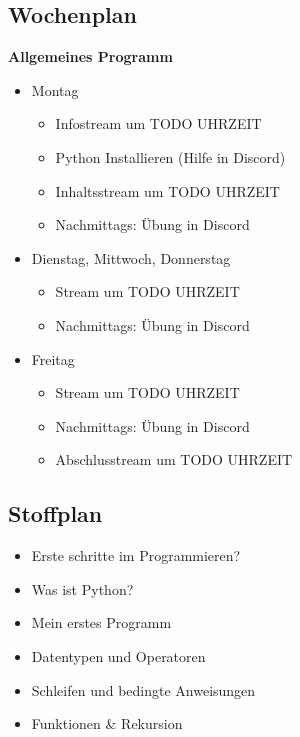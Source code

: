 \subsection{Wochenplan}
\begin{frame}
	\slidehead
	\textbf{Allgemeines Programm}
	\begin{itemize}
		\item Montag
		\begin{itemize}
			\item Infostream um TODO UHRZEIT
			\item Python Installieren (Hilfe in Discord)
			\item Inhaltsstream um TODO UHRZEIT
			\item Nachmittags: Übung in Discord
		\end{itemize}
		\item Dienstag, Mittwoch, Donnerstag
		\begin{itemize}
			\item Stream um TODO UHRZEIT
			\item Nachmittags: Übung in Discord
		\end{itemize}
		\item Freitag
		\begin{itemize}
			\item Stream um TODO UHRZEIT
			\item Nachmittags: Übung in Discord
			\item Abschlusstream um TODO UHRZEIT
		\end{itemize}
	\end{itemize}
\end{frame}

\subsection{Stoffplan}
\begin{frame}
	\slidehead
	\begin{itemize}
		\item Erste schritte im Programmieren?
		\item Was ist Python?
		\item Mein erstes Programm
		\item Datentypen und Operatoren
		\item Schleifen und bedingte Anweisungen
		\item Funktionen \& Rekursion
	\end{itemize}
\end{frame}

